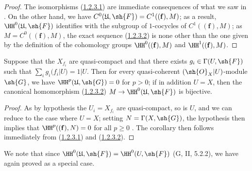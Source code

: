\begin{proof}
The isomorphisms (\hyperref[III.1.2.3.1]{1.2.3.1}) are immediate consequences of what we saw in .
On the other hand, we have $C^0(\mathfrak{U},\sh{F})=C^1((\mathbf{f}),M)$; as a result, $\HH^0(\mathfrak{U},\sh{F})$ identifies with the subgroup of $1$-cocycles of $C^1((\mathbf{f}),M)$; as $M=C^0((\mathbf{f}),M)$, the exact sequence (\hyperref[III.1.2.3.2]{1.2.3.2}) is none other than the one given by the definition of the cohomology groups $\HH^0((\mathbf{f}),M)$ and $\HH^1((\mathbf{f}),M)$.
\end{proof}

\begin{corollary}[1.2.4]
\label{III.1.2.4}
Suppose that the $X_{f_i}$ are quasi-compact and that there exists $g_i\in\Gamma(U,\sh{F})$ such that $\sum_i g_i(f_i|U)=1|U$.
Then for every quasi-coherent $(\sh{O}_X|U)$-module $\sh{G}$, we have $\HH^p(\mathfrak{U},\sh{G})=0$ for $p>0$; if in addition $U=X$, then the canonical homomorphism (\hyperref[III.1.2.3.2]{1.2.3.2}) $M\to\HH^0(\mathfrak{U},\sh{F})$ is bijective.
\end{corollary}

\begin{proof}
As by hypothesis the $U_i=X_{f_i}$ are quasi-compact, so is $U$, and we can reduce to the case where $U=X$; setting $N=\Gamma(X,\sh{G})$, the hypothesis then implies that $\HH^p((\mathbf{f}),N)=0$ for all $p\geq 0$ .
The corollary then follows immediately from (\hyperref[III.1.2.3.1]{1.2.3.1}) and (\hyperref[III.1.2.3.2]{1.2.3.2}).
\end{proof}

We note that since $\HH^0(\mathfrak{U},\sh{F})=\HH^0(U,\sh{F})$ (G, II, 5.2.2), we have again proved  as a special case.

